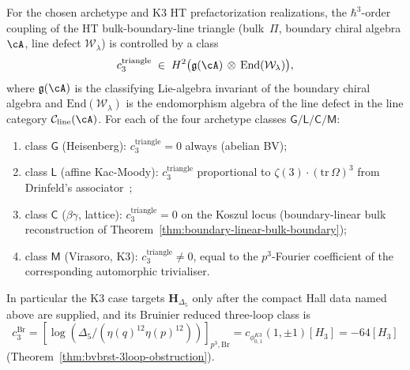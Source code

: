 \begin{theorem}
\label{thm:htbb-3loop-triangle-general}
For the chosen archetype and K3 HT prefactorization realizations, the
$\hbar^3$-order coupling of the HT bulk-boundary-line triangle
(bulk~$\Pi$, boundary chiral algebra $\cA$, line defect
$\mathcal{W}_\lambda$) is controlled by a class
\[
 c_3^{\mathrm{triangle}}
 \;\in\;
 H^2\bigl(\mathfrak{g}(\cA)\,\otimes\,\mathrm{End}(\mathcal{W}_\lambda)\bigr),
\]
where $\mathfrak{g}(\cA)$ is the classifying Lie-algebra invariant of the
boundary chiral algebra and $\mathrm{End}(\mathcal{W}_\lambda)$ is the
endomorphism algebra of the line defect in the line category
$\mathcal{C}_{\mathrm{line}}(\cA)$. For each of the four archetype
classes $\mathsf{G}/\mathsf{L}/\mathsf{C}/\mathsf{M}$:
\begin{enumerate}[leftmargin=1.8em,label=\textup{(\alph*)}]
\item class $\mathsf{G}$ (Heisenberg): $c_3^{\mathrm{triangle}} = 0$
 always (abelian BV);
\item class $\mathsf{L}$ (affine Kac-Moody): $c_3^{\mathrm{triangle}}$
 proportional to $\zeta(3)\cdot(\mathrm{tr}\,\Omega)^3$ from Drinfeld's
 associator~\cite{Drinfeld1991};
\item class $\mathsf{C}$ ($\beta\gamma$, lattice): $c_3^{\mathrm{triangle}} = 0$
 on the Koszul locus (boundary-linear bulk reconstruction of
 Theorem~\ref{thm:boundary-linear-bulk-boundary});
\item class $\mathsf{M}$ (Virasoro, K3): $c_3^{\mathrm{triangle}} \neq 0$,
 equal to the $p^3$-Fourier coefficient of the corresponding
 automorphic trivialiser.
\end{enumerate}
In particular the K3 case targets $\mathbf{H}_{\Delta_5}$ only after
the compact Hall data named above are supplied, and its Bruinier
reduced three-loop class is
\[
	 c^{\mathrm{Br}}_3
		=[\log(\Delta_5/(\eta(q)^{12}\eta(p)^{12}))]_{p^3,\mathrm{Br}}
	=c_{\phi_{0,1}^{K3}}(1,\pm1)[H_3]
	=-64[H_3]
\]
(Theorem~\ref{thm:bvbrst-3loop-obstruction}).
\end{theorem}

